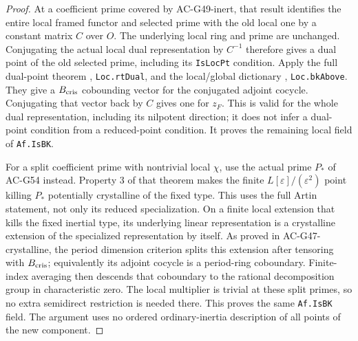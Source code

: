 \begin{proof}
At a coefficient prime covered by AC-G49-inert, that
result identifies the entire local
framed functor and selected prime with the old local
one by a constant matrix $C$ over $O$.
The underlying local ring and prime are unchanged.
Conjugating the actual local dual representation by
$C^{-1}$ therefore gives a dual point of the old
selected prime, including its \texttt{IsLocPt}
condition.  Apply the full dual-point theorem
, \texttt{Loc.rtDual},
and the local/global dictionary
, \texttt{Loc.bkAbove}.
They give a $B_{\rm cris}$ cobounding vector for the
conjugated adjoint cocycle.  Conjugating that vector
back by $C$ gives one for $z_F$.
This is valid for the whole dual representation,
including its nilpotent direction; it does not infer
a dual-point condition from a reduced-point condition.
It proves the remaining local field of
\texttt{Af.IsBK}.

For a split coefficient prime with nontrivial local
$\chi$, use the actual prime $P_*$ of AC-G54 instead.
Property 3 of that theorem makes the finite
$L[\varepsilon]/(\varepsilon^2)$ point killing $P_*$
potentially crystalline of the fixed type.  This
uses the full Artin statement, not only its reduced
specialization.  On a finite local extension that
kills the fixed inertial type, its underlying
linear representation is a crystalline extension
of the specialized representation by itself.
As proved in AC-G47-crystalline, the period
dimension criterion splits this extension after
tensoring with $B_{\rm cris}$; equivalently its
adjoint cocycle is a period-ring coboundary.
Finite-index averaging then descends that
coboundary to the rational decomposition group
in characteristic zero.  The local multiplier
is trivial at these split primes, so no extra
semidirect restriction is needed there.
This proves the same \texttt{Af.IsBK} field.
The argument uses no ordered ordinary-inertia
description of all points of the new component.
\end{proof}

